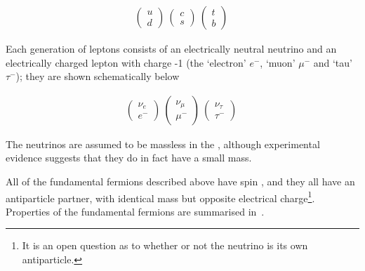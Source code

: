 \begin{align}
\left( \begin{array}{c} u \\ d \end{array} \right) \ 
\left( \begin{array}{c} c \\ s \end{array} \right) \ 
\left( \begin{array}{c} t \\ b \end{array} \right) \ 
\end{align}

Each generation of leptons consists of an electrically neutral neutrino
and an electrically charged lepton with charge -1 (the `electron' $e^{-}$, `muon' $\mu^{-}$ and
`tau' $\tau^{-}$); they are shown schematically below

\begin{align}
\left( \begin{array}{c} \nu_{e} \\ e^{-} \end{array} \right) \ 
\left( \begin{array}{c} \nu_{\mu} \\ \mu^{-} \end{array} \right) \ 
\left( \begin{array}{c} \nu_{\tau} \\ \tau^{-} \end{array} \right) \ 
\end{align} 

The neutrinos are assumed to be massless in the \sm, although experimental
evidence suggests that they do in fact have a small mass.

All of the fundamental fermions described above have spin , and they all have an antiparticle partner, with
identical mass but opposite electrical charge\footnote{It is an open question
as to whether or not the neutrino is its own antiparticle.}.
Properties of the fundamental fermions are summarised in~.

